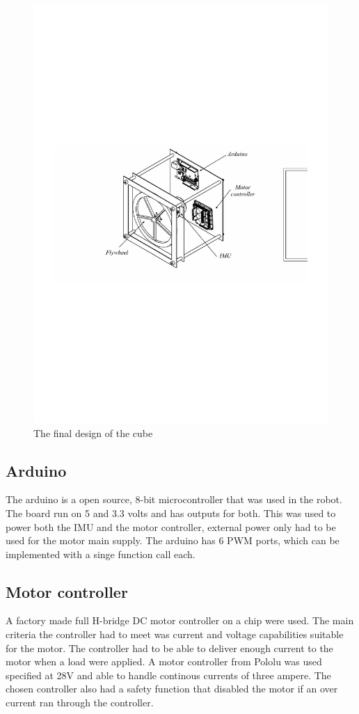 \documentclass[a4paper,11pt]{kth-mag}
\begin{document}
\begin{figure}[!htb]
\centering
\includegraphics[trim=5cm 10cm 5cm 9cm, clip=true,scale=.9]{Finaldesign.pdf}
\caption{The final design of the cube}
\label{Fig: final design}
\end{figure}

\subsection{Arduino}
The arduino is a open source, 8-bit microcontroller that was used in the robot. 
The board run on 5 and 3.3 volts and has outputs for both. This was used to power both the IMU and the motor controller, external power only had to be used for the motor main supply. 
The arduino has 6 PWM ports, which can be implemented with a singe function call each.


\subsection{Motor controller}
A factory made full H-bridge DC motor controller on a chip were used. The main criteria the controller had to meet was current and voltage capabilities suitable for the motor. The controller had to be able to deliver enough current to the motor when a load were applied. A motor controller from Pololu was used specified at 28V and able to handle continous currents of three ampere. The chosen controller also had a safety function that disabled the motor if an over current ran through the controller.
\end{document}
